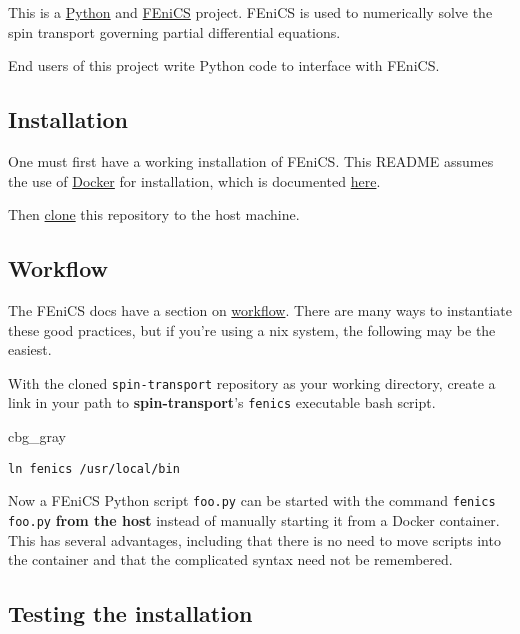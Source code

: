 \documentclass[%
oneside,                 %
final,                   %
10pt]{article}
\newenvironment{_cod_tight}[1]{
   \def\FrameCommand{\colorbox{#1}}
   \FrameRule0.6pt\MakeFramed {\FrameRestore}\vskip3mm}
   {\vskip0mm\endMakeFramed}
\newenvironment{cod}[1]{
\bgroup\rmfamily
\fboxsep=0mm\relax
\begin{_cod_tight}{#1}
\list{}{\parsep=-2mm\parskip=0mm\topsep=0pt\leftmargin=2mm
\rightmargin=2\leftmargin\leftmargin=4pt\relax}
\item\relax}
{\endlist\end{_cod_tight}\egroup}
\begin{document}
This is a \href{{https://www.python.org/}}{Python} and \href{{https://fenicsproject.org/}}{FEniCS} project. FEniCS is used to numerically solve the spin transport governing partial differential equations.

End users of this project write Python code to interface with FEniCS.

\subsection{Installation}

One must first have a working installation of FEniCS.
This README assumes the use of \href{{https://www.docker.com/}}{Docker} for installation, which is documented \href{{http://fenics.readthedocs.io/projects/containers/en/latest/}}{here}.

Then \href{{https://help.github.com/articles/cloning-a-repository/}}{clone} this repository to the host machine.

\subsection{Workflow}

The FEniCS docs have a section on \href{{http://fenics.readthedocs.io/projects/containers/en/latest/work_flows.html}}{workflow}.
There are many ways to instantiate these good practices, but if you're using a \*nix system, the following may be the easiest.

With the cloned \texttt{spin-transport} repository as your working directory, create a link in your path to \textbf{spin-transport}'s \texttt{fenics} executable bash script.

\begin{cod}{cbg_gray}\begin{verbatim}
ln fenics /usr/local/bin
\end{verbatim}
\end{cod}
\noindent

Now a FEniCS Python script \texttt{foo.py} can be started with the command \texttt{fenics foo.py} \textbf{from the host} instead of manually starting it from a Docker container.
This has several advantages, including that there is no need to move scripts into the container and that the complicated syntax need not be remembered.

\subsection{Testing the installation}
\end{document}
